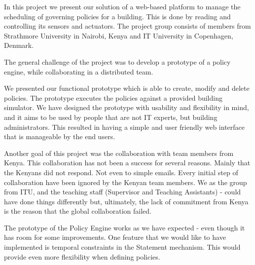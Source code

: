 In this project we present our solution of a web-based platform to manage the scheduling of governing policies for a building. This is done by reading and controlling its sensors and actuators. The project group consists of members from Strathmore University in Nairobi, Kenya and IT University in Copenhagen, Denmark.

The general challenge of the project was to develop a prototype of a policy engine, while collaborating in a distributed team. 

We presented our functional prototype which is able to create, modify and delete policies. The prototype executes the policies against a provided building simulator. We have designed the prototype with usability and flexibility in mind, and it aims to be used by people that are not IT experts, but building administrators. This resulted in having a simple and user friendly web interface that is manageable by the end users. 

Another goal of this project was the collaboration with team members from Kenya. This collaboration has not been a success for several reasons. Mainly that the Kenyans did not respond. Not even to simple emails. Every initial step of collaboration have been ignored by the Kenyan team members. We as the group from ITU, and the teaching staff (Supervisor and Teaching Assistants) - could have done things differently but, ultimately, the lack of commitment from Kenya is the reason that the global collaboration failed.

The prototype of the Policy Engine works as we have expected - even though it has room for some improvements. One feature that we would like to have implemented is temporal constraints in the Statement mechanism. This would provide even more flexibility when defining policies.




